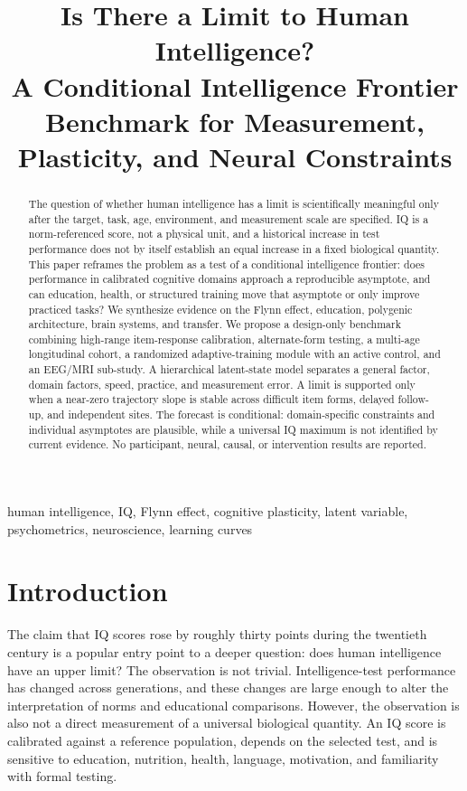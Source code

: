 \documentclass[conference]{IEEEtran}
\title{Is There a Limit to Human Intelligence?\\
A Conditional Intelligence Frontier Benchmark for Measurement, Plasticity, and Neural Constraints}
\author{\IEEEauthorblockN{Research Design Report}
\IEEEauthorblockA{Four-Agent Scientific Workflow: Survey--Idea--ExperimentDesign--Author}}
\begin{document}
\maketitle

\begin{abstract}
The question of whether human intelligence has a limit is scientifically meaningful only after the target, task, age, environment, and measurement scale are specified. IQ is a norm-referenced score, not a physical unit, and a historical increase in test performance does not by itself establish an equal increase in a fixed biological quantity. This paper reframes the problem as a test of a conditional intelligence frontier: does performance in calibrated cognitive domains approach a reproducible asymptote, and can education, health, or structured training move that asymptote or only improve practiced tasks? We synthesize evidence on the Flynn effect, education, polygenic architecture, brain systems, and transfer. We propose a design-only benchmark combining high-range item-response calibration, alternate-form testing, a multi-age longitudinal cohort, a randomized adaptive-training module with an active control, and an EEG/MRI sub-study. A hierarchical latent-state model separates a general factor, domain factors, speed, practice, and measurement error. A limit is supported only when a near-zero trajectory slope is stable across difficult item forms, delayed follow-up, and independent sites. The forecast is conditional: domain-specific constraints and individual asymptotes are plausible, while a universal IQ maximum is not identified by current evidence. No participant, neural, causal, or intervention results are reported.
\end{abstract}

\begin{IEEEkeywords}
human intelligence, IQ, Flynn effect, cognitive plasticity, latent variable, psychometrics, neuroscience, learning curves
\end{IEEEkeywords}

\section{Introduction}
\label{sec:intro}
The claim that IQ scores rose by roughly thirty points during the twentieth century is a popular entry point to a deeper question: does human intelligence have an upper limit? The observation is not trivial. Intelligence-test performance has changed across generations, and these changes are large enough to alter the interpretation of norms and educational comparisons. However, the observation is also not a direct measurement of a universal biological quantity. An IQ score is calibrated against a reference population, depends on the selected test, and is sensitive to education, nutrition, health, language, motivation, and familiarity with formal testing.
\end{document}
